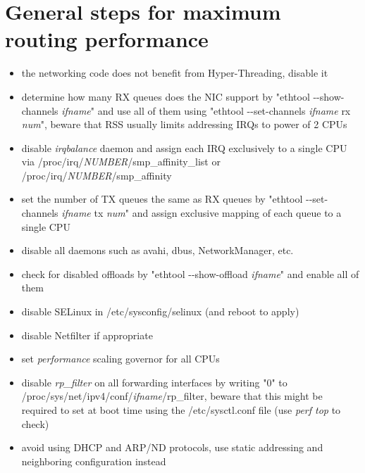 \chapter{General steps for maximum routing performance}\label{app:general-steps}
\begin{itemize}
\item the networking code does not benefit from Hyper-Threading, disable it
\item determine how many RX queues does the NIC support by "ethtool -{}-show-channels {\it{ifname}}" and use all of them using
"ethtool -{}-set-channels {\it{ifname}} rx {\it{num}}", beware that RSS usually limits addressing IRQs to power of 2 CPUs
\item disable {\it{irqbalance}} daemon and assign each IRQ exclusively to a single CPU via /proc/irq/{\it{NUMBER}}/smp\_affinity\_list
or /proc/irq/{\it{NUMBER}}/smp\_affinity
\item set the number of TX queues the same as RX queues by "ethtool -{}-set-channels {\it{ifname}} tx {\it{num}}" and assign exclusive mapping
of each queue to a single CPU
\item disable all daemons such as avahi, dbus, NetworkManager, etc.
\item check for disabled offloads by "ethtool -{}-show-offload {\it{ifname}}" and enable all of them
\item disable SELinux in /etc/sysconfig/selinux (and reboot to apply)
\item disable Netfilter if appropriate
\item set {\it{performance}} scaling governor for all CPUs
\item disable {\it{rp\_filter}} on all forwarding interfaces by writing "0" to \\
/proc/sys/net/ipv4/conf/{\it{ifname}}/rp\_filter,
beware that this might be required to set at boot time using the /etc/sysctl.conf file (use {\it{perf top}} to check)
\item avoid using DHCP and ARP/ND protocols, use static addressing and neighboring configuration instead
\end{itemize}
